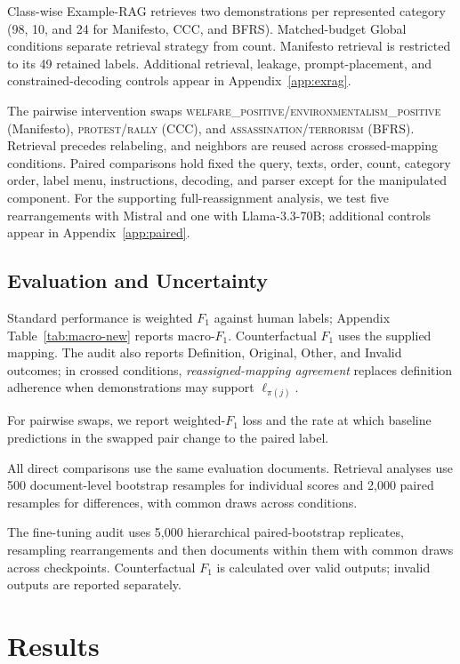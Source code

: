 \documentclass[11pt]{article}
\begin{document}
Class-wise Example-RAG retrieves two demonstrations per represented category (98, 10, and 24 for Manifesto, CCC, and BFRS). Matched-budget Global conditions separate retrieval strategy from count. Manifesto retrieval is restricted to its 49 retained labels. Additional retrieval, leakage, prompt-placement, and constrained-decoding controls appear in Appendix~\ref{app:exrag}.

The pairwise intervention swaps \textsc{welfare\_positive}/\textsc{environmentalism\_positive} (Manifesto), \textsc{protest}/\textsc{rally} (CCC), and \textsc{assassination}/\textsc{terrorism} (BFRS). Retrieval precedes relabeling, and neighbors are reused across crossed-mapping conditions. Paired comparisons hold fixed the query, texts, order, count, category order, label menu, instructions, decoding, and parser except for the manipulated component. For the supporting full-reassignment analysis, we test five rearrangements with Mistral and one with Llama-3.3-70B; additional controls appear in Appendix~\ref{app:paired}.

\subsection{Evaluation and Uncertainty}
\label{sec:m-eval}

Standard performance is weighted \(F_1\) against human labels; Appendix Table~\ref{tab:macro-new} reports macro-\(F_1\). Counterfactual \(F_1\) uses the supplied mapping. The audit also reports Definition, Original, Other, and Invalid outcomes; in crossed conditions, \emph{reassigned-mapping agreement} replaces definition adherence when demonstrations may support \(\ell_{\pi(j)}\).

For pairwise swaps, we report weighted-\(F_1\) loss and the rate at which baseline predictions in the swapped pair change to the paired label.

All direct comparisons use the same evaluation documents. Retrieval analyses use 500 document-level bootstrap resamples for individual scores and 2,000 paired resamples for differences, with common draws across conditions.

The fine-tuning audit uses 5,000 hierarchical paired-bootstrap replicates, resampling rearrangements and then documents within them with common draws across checkpoints. Counterfactual \(F_1\) is calculated over valid outputs; invalid outputs are reported separately.




\section{Results}
\label{sec:results}
\end{document}
